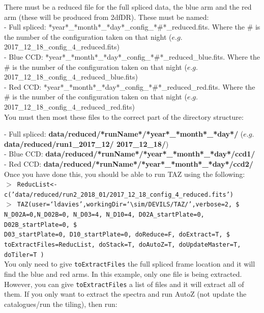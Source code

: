 \documentclass[12pt]{article}
\begin{document}
There must be a reduced file for the full spliced data, the blue arm and the red arm (these will be produced from 2dfDR). These must be named:\\

- Full spliced:  *year*\_*month*\_*day*\_config\_*\#*\_reduced.fits. Where the \# is the number of the configuration taken on that night ($e.g.$ 2017\_12\_18\_config\_4\_reduced.fits)\\
- Blue CCD:  *year*\_*month*\_*day*\_config\_*\#*\_reduced\_blue.fits. Where the \# is the number of the configuration taken on that night ($e.g.$ 2017\_12\_18\_config\_4\_reduced\_blue.fits)\\
- Red CCD:  *year*\_*month*\_*day*\_config\_*\#*\_reduced\_red.fits. Where the \# is the number of the configuration taken on that night ($e.g.$ 2017\_12\_18\_config\_4\_reduced\_red.fits)\\

You must then most these files to the correct part of the directory structure:

- Full spliced: \textbf{data/reduced/*runName*/*year*\_*month*\_*day*/} ($e.g.$ \textbf{data/reduced/run1\_2017\_12/ 2017\_12\_18/}) \\
- Blue CCD: \textbf{data/reduced/*runName*/*year*\_*month*\_*day*/ccd1/} \\
- Red CCD: \textbf{data/reduced/*runName*/*year*\_*month*\_*day*/ccd2/}\\
 
 Once you have done this, you should be able to run TAZ using the following:\\
 
 
 \hspace{10mm} \texttt{$>$ ReducList<-c('data/reduced/run2\_2018\_01/2017\_12\_18\_config\_4\_reduced.fits')}\\
 
 \hspace{10mm} \texttt{$>$ TAZ(user=`ldavies',workingDir=`$\sim$/DEVILS/TAZ/',verbose=2, \$ \\
N\_D02A=0,N\_D02B=0, N\_D03=4, N\_D10=4, D02A\_startPlate=0, D02B\_startPlate=0, \$ \\ 
D03\_startPlate=0, D10\_startPlate=0,  doReduce=F, doExtract=T,  \$ \\
toExtractFiles=ReducList, doStack=T,  doAutoZ=T, doUpdateMaster=T, doTiler=T ) }\\

You only need to give  \texttt{toExtractFiles} the full spliced frame location and it will find the blue and red arms. In this example, only one file is being extracted. However, you can give \texttt{toExtractFiles} a list of files and it will extract all of them. If you only want to extract the spectra and run AutoZ (not update the catalogues/run the tiling), then run: \\
\end{document}
